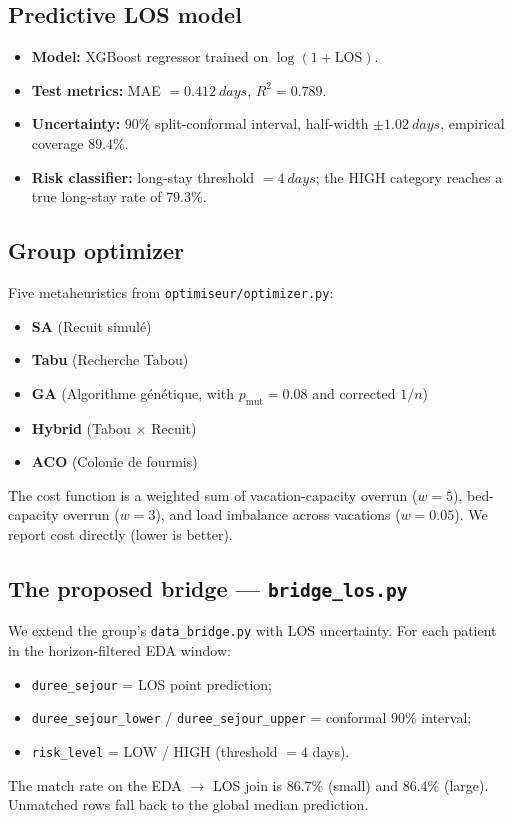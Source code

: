 \documentclass[11pt,a4paper]{article}
\begin{document}
\subsection{Predictive LOS model}
\begin{itemize}[nosep]
  \item \textbf{Model:} XGBoost regressor trained on \(\log(1+\mathrm{LOS})\).
  \item \textbf{Test metrics:} MAE \(= \SI{0.412}{days}\), \(R^2 = 0.789\).
  \item \textbf{Uncertainty:} 90\% split-conformal interval, half-width \(\pm \SI{1.02}{days}\), empirical coverage \(89.4\%\).
  \item \textbf{Risk classifier:} long-stay threshold \(= \SI{4}{days}\); the HIGH category reaches a true long-stay rate of \(79.3\%\).
\end{itemize}

\subsection{Group optimizer}
Five metaheuristics from \texttt{optimiseur/optimizer.py}:
\begin{itemize}[nosep]
  \item \textbf{SA} (Recuit simul\'e)
  \item \textbf{Tabu} (Recherche Tabou)
  \item \textbf{GA} (Algorithme g\'en\'etique, with \(p_{\mathrm{mut}}=0.08\) and corrected \(1/n\))
  \item \textbf{Hybrid} (Tabou \(\times\) Recuit)
  \item \textbf{ACO} (Colonie de fourmis)
\end{itemize}
The cost function is a weighted sum of vacation-capacity overrun (\(w=5\)), bed-capacity overrun (\(w=3\)), and load imbalance across vacations (\(w=0.05\)). We report cost directly (lower is better).

\subsection{The proposed bridge --- \texttt{bridge\_los.py}}
We extend the group's \texttt{data\_bridge.py} with LOS uncertainty. For each patient in the horizon-filtered EDA window:
\begin{itemize}[nosep]
  \item \texttt{duree\_sejour} = LOS point prediction;
  \item \texttt{duree\_sejour\_lower} / \texttt{duree\_sejour\_upper} = conformal 90\% interval;
  \item \texttt{risk\_level} = LOW / HIGH (threshold \(=4\) days).
\end{itemize}
The match rate on the EDA \(\to\) LOS join is \(86.7\%\) (small) and \(86.4\%\) (large). Unmatched rows fall back to the global median prediction.
\end{document}
